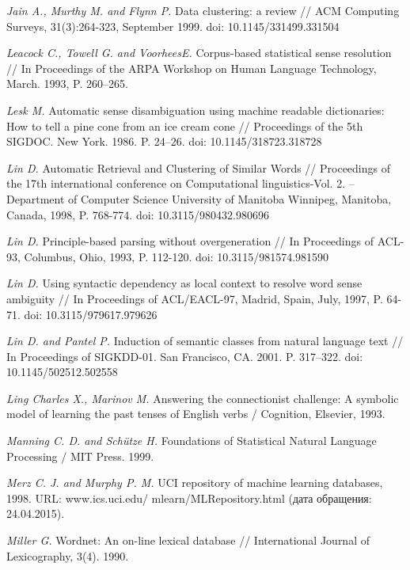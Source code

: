 \documentclass{article}
\begin{document}
\begin{articletext}
\begin{thebibliography}{9}
\textit{Jain A.,  Murthy M. and  Flynn P. }Data clustering: a review // ACM Computing Surveys, 31(3):264-323, September 1999. doi: 10.1145/331499.331504

\textit{Leacock C.,  Towell G. and  VoorheesE. }Corpus-based statistical sense resolution // In Proceedings of the ARPA Workshop on Human Language Technology, March. 1993, P. 260–265.  

\textit{Lesk M. }Automatic sense disambiguation using machine readable dictionaries: How to tell a pine cone from an ice cream cone //  Proceedings  of  the 5th SIGDOC. New York. 1986. P. 24–26. doi: 10.1145/318723.318728

\textit{Lin D. }Automatic Retrieval and Clustering of Similar Words // Proceedings of the 17th international conference on Computational linguistics-Vol. 2. –  Department of Computer Science University of Manitoba Winnipeg, Manitoba, Canada, 1998, P. 768-774. doi: 10.3115/980432.980696

\textit{Lin D. }Principle-based parsing without overgeneration // In Proceedings of ACL-93, Columbus, Ohio, 1993, P. 112-120. doi: 10.3115/981574.981590

\textit{Lin D. }Using syntactic dependency as local context to resolve word sense ambiguity // In Proceedings of ACL/EACL-97, Madrid, Spain, July, 1997, P. 64-71. doi: 10.3115/979617.979626


\textit{Lin D. and Pantel P. }Induction of semantic classes from natural language text // In Proceedings of SIGKDD-01. San Francisco, CA. 2001. P. 317–322. doi: 10.1145/502512.502558  

\textit{Ling Charles X.,  Marinov M. }Answering the connectionist challenge: A symbolic model of learning the past tenses of English verbs /  Cognition, Elsevier, 1993.


\textit{Manning C. D. and  Sch\"utze H. }Foundations of Statistical Natural Language Processing / MIT Press. 1999.

\textit{Merz C. J. and  Murphy P. M. }UCI repository of machine learning databases, 1998. URL: www.ics.uci.edu/ mlearn/MLRepository.html (дата обращения: 24.04.2015).

\textit{Miller G. }Wordnet: An on-line lexical database // International Journal of Lexicography, 3(4). 1990.


\end{thebibliography}
\end{articletext}
\end{document}
